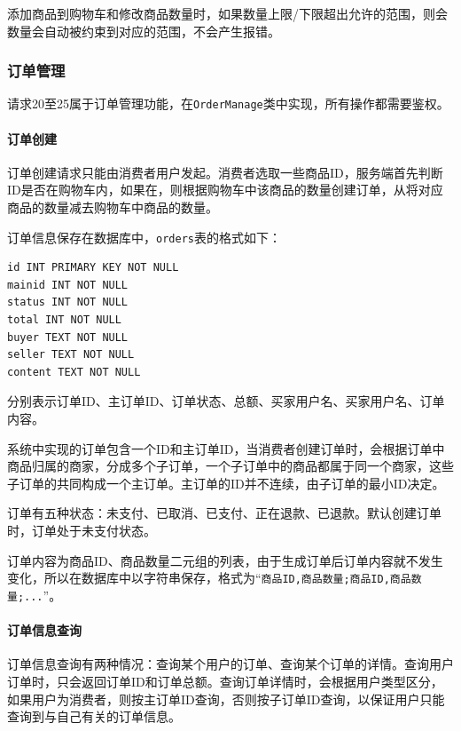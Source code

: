 \documentclass[lang=cn,11pt,a4paper,cite=authornum]{paper}
\begin{document}
添加商品到购物车和修改商品数量时，如果数量上限/下限超出允许的范围，则会数量会自动被约束到对应的范围，不会产生报错。

\subsubsection{订单管理}

请求20至25属于订单管理功能，在\texttt{OrderManage}类中实现，所有操作都需要鉴权。

\paragraph{订单创建}

订单创建请求只能由消费者用户发起。消费者选取一些商品ID，服务端首先判断ID是否在购物车内，如果在，则根据购物车中该商品的数量创建订单，从将对应商品的数量减去购物车中商品的数量。

订单信息保存在数据库中，\texttt{orders}表的格式如下：

\begin{code}
\begin{verbatim}
id INT PRIMARY KEY NOT NULL
mainid INT NOT NULL
status INT NOT NULL
total INT NOT NULL
buyer TEXT NOT NULL
seller TEXT NOT NULL
content TEXT NOT NULL
\end{verbatim}
\end{code}

分别表示订单ID、主订单ID、订单状态、总额、买家用户名、买家用户名、订单内容。

系统中实现的订单包含一个ID和主订单ID，当消费者创建订单时，会根据订单中商品归属的商家，分成多个子订单，一个子订单中的商品都属于同一个商家，这些子订单的共同构成一个主订单。主订单的ID并不连续，由子订单的最小ID决定。

订单有五种状态：未支付、已取消、已支付、正在退款、已退款。默认创建订单时，订单处于未支付状态。

订单内容为商品ID、商品数量二元组的列表，由于生成订单后订单内容就不发生变化，所以在数据库中以字符串保存，格式为“\texttt{商品ID,商品数量;商品ID,商品数量;...}”。

\paragraph{订单信息查询}

订单信息查询有两种情况：查询某个用户的订单、查询某个订单的详情。查询用户订单时，只会返回订单ID和订单总额。查询订单详情时，会根据用户类型区分，如果用户为消费者，则按主订单ID查询，否则按子订单ID查询，以保证用户只能查询到与自己有关的订单信息。
\end{document}
